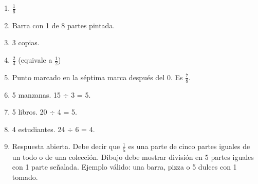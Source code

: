 \wbanswers{\wbLReview}
\begin{enumerate}
\item $\frac{1}{6}$
\item Barra con 1 de 8 partes pintada.
\item 3 copias.
\item $\frac{2}{4}$ (equivale a $\frac{1}{2}$)
\item Punto marcado en la séptima marca después del 0. Es $\frac{7}{8}$.
\item 5 manzanas. 15 $\div$ 3 = 5.
\item 5 libros. 20 $\div$ 4 = 5.
\item 4 estudiantes. 24 $\div$ 6 = 4.
\item Respuesta abierta. Debe decir que $\frac{1}{5}$ es una parte de cinco partes iguales de un todo o de una colección. Dibujo debe mostrar división en 5 partes iguales con 1 parte señalada. Ejemplo válido: una barra, pizza o 5 dulces con 1 tomado.
\end{enumerate}
